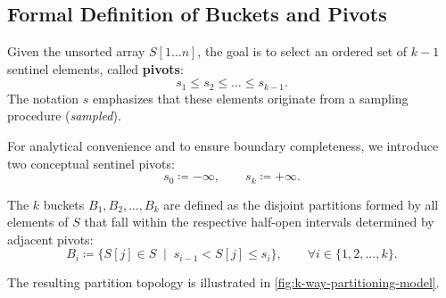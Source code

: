 \subsection{Formal Definition of Buckets and Pivots}
Given the unsorted array $S[1 \dots n]$, the goal is to select an ordered set of $k - 1$ sentinel elements, called \textbf{pivots}:
\begin{equation}
  s_1 \le s_2 \le \dots \le s_{k-1}.
\end{equation}
The notation $s$ emphasizes that these elements originate from a sampling procedure (\textit{sampled}).

For analytical convenience and to ensure boundary completeness, we introduce two conceptual sentinel pivots:
\begin{equation}
  s_0 \coloneqq -\infty, \qquad s_k \coloneqq +\infty.
\end{equation}

\begin{definition}[Buckets $B_i$]
The $k$ buckets $B_1, B_2, \dots, B_k$ are defined as the disjoint partitions formed by all elements of $S$ that fall within the respective half-open intervals determined by adjacent pivots:
\begin{equation}
  B_i \coloneqq \Big\{ S[j] \in S \;\mid\; s_{i-1} < S[j] \le s_i \Big\}, \qquad \forall i \in \{1, 2, \dots, k\}.
  \label{eq:bucket-formal-def}
\end{equation}
\end{definition}

The resulting partition topology is illustrated in \autoref{fig:k-way-partitioning-model}.

